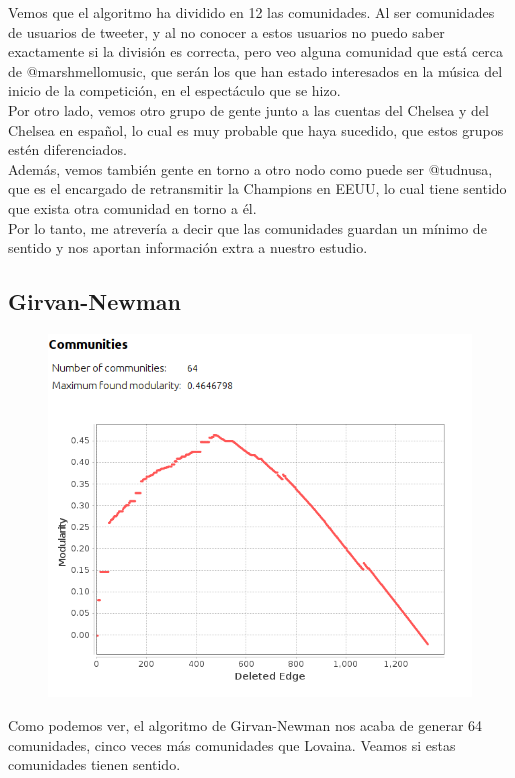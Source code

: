 Vemos que el algoritmo ha dividido en 12 las comunidades. Al ser comunidades de usuarios de tweeter, y al no conocer a estos usuarios no puedo saber exactamente si la división es correcta, pero veo alguna comunidad que está cerca de @marshmellomusic, que serán los que han estado interesados en la música del inicio de la competición, en el espectáculo que se hizo. \\
Por otro lado, vemos otro grupo de gente junto a las cuentas del Chelsea y del Chelsea en español, lo cual es muy probable que haya sucedido, que estos grupos estén diferenciados.\\
Además, vemos también gente en torno a otro nodo como puede ser @tudnusa, que es el encargado de retransmitir la Champions en EEUU, lo cual tiene sentido que exista otra comunidad en torno a él. \\
Por lo tanto, me atrevería a decir que las comunidades guardan un mínimo de sentido y nos aportan información extra a nuestro estudio.

\subsection{Girvan-Newman}
\begin{figure}[H]
	\centering
	\includegraphics[width=0.7\linewidth]{Imagenes/screenshot015}
\end{figure}

Como podemos ver, el algoritmo de Girvan-Newman nos acaba de generar 64 comunidades, cinco veces más comunidades que Lovaina. Veamos si estas comunidades tienen sentido.

